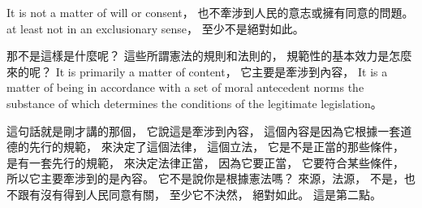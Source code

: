 \hypertarget{w02:cue:104}{}It is not a matter of will or consent，
\hypertarget{w02:cue:105}{}也不牽涉到人民的意志或擁有同意的問題。
\hypertarget{w02:cue:106}{}at least not in an exclusionary sense，
\hypertarget{w02:cue:107}{}至少不是絕對如此。

\hypertarget{w02:cue:108}{}那不是這樣是什麼呢？
\hypertarget{w02:cue:109}{}這些所謂憲法的規則和法則的，
\hypertarget{w02:cue:110}{}規範性的基本效力是怎麼來的呢？
\hypertarget{w02:cue:111}{}It is primarily a matter of content，
\hypertarget{w02:cue:112}{}它主要是牽涉到內容，
\hypertarget{w02:cue:113}{}It is a matter of being in accordance with a set of moral
\hypertarget{w02:cue:114}{}antecedent norms
\hypertarget{w02:cue:115}{}the substance of which determines the conditions of the legitimate legislation。

\hypertarget{w02:cue:116}{}這句話就是剛才講的那個，
\hypertarget{w02:cue:117}{}它說這是牽涉到內容，
\hypertarget{w02:cue:118}{}這個內容是因為它根據一套道德的先行的規範，
\hypertarget{w02:cue:119}{}來決定了這個法律，
\hypertarget{w02:cue:120}{}這個立法，
\hypertarget{w02:cue:121}{}它是不是正當的那些條件，
\hypertarget{w02:cue:122}{}是有一套先行的規範，
\hypertarget{w02:cue:123}{}來決定法律正當，
\hypertarget{w02:cue:124}{}因為它要正當，
\hypertarget{w02:cue:125}{}它要符合某些條件，
\hypertarget{w02:cue:126}{}所以它主要牽涉到的是內容。
\hypertarget{w02:cue:127}{}它不是說你是根據憲法嗎？
\hypertarget{w02:cue:128}{}來源，法源，
\hypertarget{w02:cue:129}{}不是，也不跟有沒有得到人民同意有關，
\hypertarget{w02:cue:130}{}至少它不決然，
\hypertarget{w02:cue:131}{}絕對如此。
\hypertarget{w02:cue:132}{}這是第二點。


